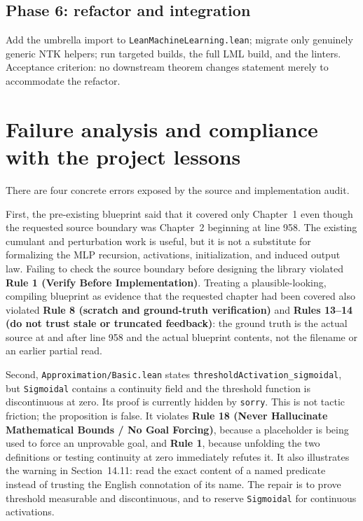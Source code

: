 \subsection*{Phase 6: refactor and integration}
Add the umbrella import to \texttt{LeanMachineLearning.lean}; migrate only genuinely generic NTK
helpers; run targeted builds, the full LML build, and the linters.  Acceptance criterion: no
downstream theorem changes statement merely to accommodate the refactor.

\section{Failure analysis and compliance with the project lessons}

There are four concrete errors exposed by the source and implementation audit.

First, the pre-existing blueprint said that it covered only Chapter~1 even though the requested
source boundary was Chapter~2 beginning at line 958.  The existing cumulant and perturbation work
is useful, but it is not a substitute for formalizing the MLP recursion, activations, initialization,
and induced output law.  Failing to check the source boundary before designing the library violated
\textbf{Rule 1 (Verify Before Implementation)}.  Treating a plausible-looking, compiling blueprint
as evidence that the requested chapter had been covered also violated \textbf{Rule 8 (scratch and
ground-truth verification)} and \textbf{Rules 13--14 (do not trust stale or truncated feedback)}:
the ground truth is the actual source at and after line 958 and the actual blueprint contents, not
the filename or an earlier partial read.

Second, \texttt{Approximation/Basic.lean} states
\texttt{thresholdActivation\_sigmoidal}, but \texttt{Sigmoidal} contains a continuity field and the
threshold function is discontinuous at zero.  Its proof is currently hidden by \texttt{sorry}.
This is not tactic friction; the proposition is false.  It violates \textbf{Rule 18 (Never
Hallucinate Mathematical Bounds / No Goal Forcing)}, because a placeholder is being used to force
an unprovable goal, and \textbf{Rule 1}, because unfolding the two definitions or testing continuity
at zero immediately refutes it.  It also illustrates the warning in Section~14.11: read the exact
content of a named predicate instead of trusting the English connotation of its name.  The repair is
to prove threshold measurable and discontinuous, and to reserve \texttt{Sigmoidal} for continuous
activations.

